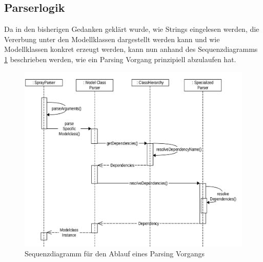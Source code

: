 \subsection{Parserlogik}
Da in den bisherigen Gedanken geklärt wurde, wie Strings eingelesen werden, die Vererbung unter den Modellklassen dargestellt werden kann und wie Modellklassen konkret erzeugt werden, kann nun anhand des Sequenzdiagramms \ref{sequenzdiagrammAnsatz} beschrieben werden, wie ein Parsing Vorgang prinzipiell abzulaufen hat.\linebreak
\begin{figure}[htb]
	\hspace*{-0.5cm}
		\includegraphics[scale = 0.13]{Bilder/sequenzdiagrammAnsatzKomprimiertScaled(2500x2500).png}
		\caption{Sequenzdiagramm für den Ablauf eines Parsing Vorgangs}
		\label{sequenzdiagrammAnsatz}

\end{figure}

